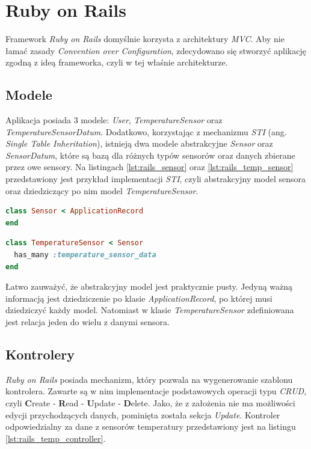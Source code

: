 \section{Ruby on Rails}
Framework \emph{Ruby on Rails} domyślnie korzysta z architektury \emph{MVC}. Aby nie łamać zasady \emph{Convention over Configuration}, zdecydowano się stworzyć aplikację zgodną z ideą frameworka, czyli w tej właśnie architekturze.

\subsection{Modele}
Aplikacja posiada 3 modele: \emph{User}, \emph{TemperatureSensor} oraz \emph{TemperatureSensorDatum}. Dodatkowo, korzystając z mechanizmu \emph{STI} (ang. \emph{Single Table Inheritation}), istnieją dwa modele abstrakcyjne \emph{Sensor} oraz \emph{SensorDatum}, które są bazą dla różnych typów sensorów oraz danych zbierane przez owe sensory. Na listingach \ref{lst:rails_sensor} oraz \ref{lst:rails_temp_sensor} przedstawiony jest przykład implementacji \emph{STI}, czyli abstrakcyjny model sensora oraz dziedziczący po nim model \emph{TemperatureSensor}.
\newpage

\begin{lstlisting}[caption={Abstrakcyjny model sensora w Ruby on Rails.},label={lst:rails_sensor},language=Ruby]
class Sensor < ApplicationRecord
end
\end{lstlisting}

\begin{lstlisting}[caption={Model sensora temperatury w Ruby on Rails.},label={lst:rails_temp_sensor},language=Ruby]
class TemperatureSensor < Sensor
  has_many :temperature_sensor_data
end
\end{lstlisting}

Łatwo zauważyć, że abstrakcyjny model jest praktycznie pusty. Jedyną ważną informacją jest dziedziczenie po klasie \emph{ApplicationRecord}, po której musi dziedziczyć każdy model. Natomiast w klasie \emph{TemperatureSensor} zdefiniowana jest relacja jeden do wielu z danymi sensora.

\subsection{Kontrolery}
\emph{Ruby on Rails} posiada mechanizm, który pozwala na wygenerowanie szablonu kontrolera. Zawarte są w nim implementacje podstawowych operacji typu \emph{CRUD}, czyli \textbf{C}reate - \textbf{R}ead - \textbf{U}pdate - \textbf{D}elete. Jako, że z założenia nie ma możliwości edycji przychodzących danych, pominięta została sekcja \emph{Update}. Kontroler odpowiedzialny za dane z sensorów temperatury przedstawiony jest na listingu \ref{lst:rails_temp_controller}.

